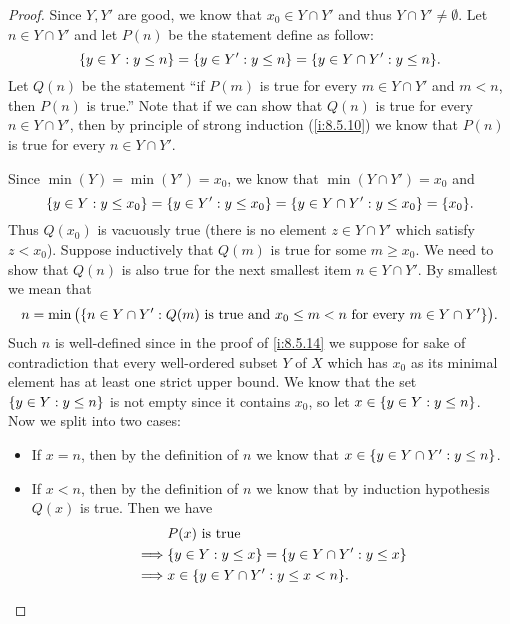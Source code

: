 \begin{proof}
  Since \(Y, Y'\) are good, we know that \(x_0 \in Y \cap Y'\) and thus \(Y \cap Y' \neq \emptyset\).
  Let \(n \in Y \cap Y'\) and let \(P(n)\) be the statement define as follow:
  \[
    \set{y \in Y : y \leq n} = \set{y \in Y' : y \leq n} = \set{y \in Y \cap Y' : y \leq n}.
  \]
  Let \(Q(n)\) be the statement ``if \(P(m)\) is true for every \(m \in Y \cap Y'\) and \(m < n\), then \(P(n)\) is true.''
  Note that if we can show that \(Q(n)\) is true for every \(n \in Y \cap Y'\), then by principle of strong induction (\cref{i:8.5.10}) we know that \(P(n)\) is true for every \(n \in Y \cap Y'\).

  Since \(\min(Y) = \min(Y') = x_0\), we know that \(\min(Y \cap Y') = x_0\) and
  \[
    \set{y \in Y : y \leq x_0} = \set{y \in Y' : y \leq x_0} = \set{y \in Y \cap Y' : y \leq x_0} = \set{x_0}.
  \]
  Thus \(Q(x_0)\) is vacuously true (there is no element \(z \in Y \cap Y'\) which satisfy \(z < x_0\)).
  Suppose inductively that \(Q(m)\) is true for some \(m \geq x_0\).
  We need to show that \(Q(n)\) is also true for the next smallest item \(n \in Y \cap Y'\).
  By smallest we mean that
  \[
    n = \min\big(\set{n \in Y \cap Y' : Q(m) \text{ is true and } x_0 \leq m < n \text { for every } m \in Y \cap Y'}\big).
  \]
  Such \(n\) is well-defined since in the proof of \cref{i:8.5.14} we suppose for sake of contradiction that every well-ordered subset \(Y\) of \(X\) which has \(x_0\) as its minimal element has at least one strict upper bound.
  We know that the set \(\left\lbrace y \in Y : y \leq n\right\rbrace\) is not empty since it contains \(x_0\), so let \(x \in \left\lbrace y \in Y : y \leq n\right\rbrace\).
  Now we split into two cases:
  \begin{itemize}
    \item If \(x = n\), then by the definition of \(n\) we know that \(x \in \left\lbrace y \in Y \cap Y' : y \leq n\right\rbrace\).
    \item If \(x < n\), then by the definition of \(n\) we know that by induction hypothesis \(Q(x)\) is true.
          Then we have
          \begin{align*}
                     & P(x) \text{ is true}                                        \\
            \implies & \set{y \in Y : y \leq x} = \set{y \in Y \cap Y' : y \leq x} \\
            \implies & x \in \set{y \in Y \cap Y' : y \leq x < n}.
          \end{align*}
  \end{itemize}

\end{proof}
